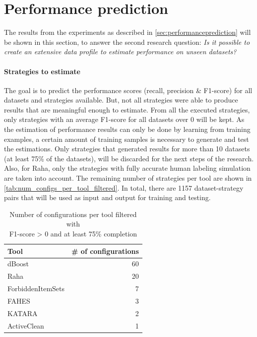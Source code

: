 \newpage
\section{Performance prediction}
The results from the experiments as described in \autoref{sec:performanceprediction} will be shown in this section, to answer the second research question: \textit{Is it possible to create an extensive data profile to estimate performance on unseen datasets?}

\paragraph{Strategies to estimate} The goal is to predict the performance scores (recall, precision \& F1-score) for all datasets and strategies available. But, not all strategies were able to produce results that are meaningful enough to estimate. From all the executed strategies, only strategies with an average F1-score for all datasets over 0 will be kept. As the estimation of performance results can only be done by learning from training examples, a certain amount of training samples is necessary to generate and test the estimations. Only strategies that generated results for more than 10 datasets (at least 75\% of the datasets), will be discarded for the next steps of the research. Also, for Raha, only the strategies with fully accurate human labeling simulation are taken into account. The remaining number of strategies per tool are shown in \autoref{tab:num_configs_per_tool_filtered}. In total, there are 1157 dataset-strategy pairs that will be used as input and output for training and testing. 

\begin{table}[h]
\centering
\begin{tabular}{lr}
\toprule
Tool         &  \# of configurations \\
\midrule
dBoost            &    60 \\
Raha              &    20 \\
ForbiddenItemSets &     7 \\
FAHES             &     3 \\
KATARA            &     2 \\
ActiveClean       &     1 \\
\bottomrule
\end{tabular}
\caption{Number of configurations per tool filtered with \\F1-score > 0 and at least 75\% completion}
\label{tab:num_configs_per_tool_filtered}
\end{table}

